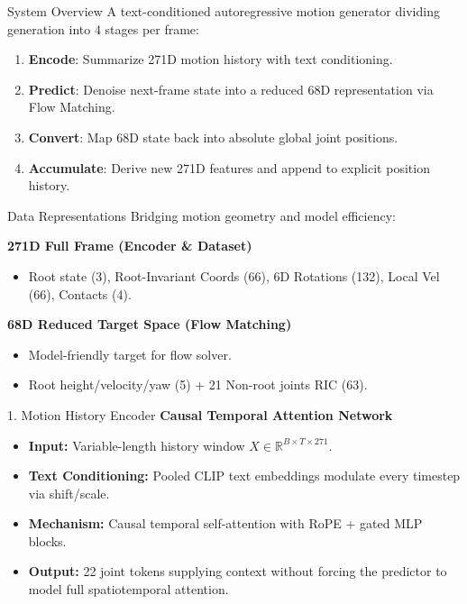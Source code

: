 \documentclass[aspectratio=169]{beamer}
\begin{document}
\begin{frame}{System Overview}
    A text-conditioned autoregressive motion generator dividing generation into 4 stages per frame:
    \begin{enumerate}
        \item \textbf{Encode}: Summarize 271D motion history with text conditioning.
        \item \textbf{Predict}: Denoise next-frame state into a reduced 68D representation via Flow Matching.
        \item \textbf{Convert}: Map 68D state back into absolute global joint positions.
        \item \textbf{Accumulate}: Derive new 271D features and append to explicit position history.
    \end{enumerate}
\end{frame}

\begin{frame}{Data Representations}
    Bridging motion geometry and model efficiency:
    \vspace{0.3cm}
    
    \textbf{271D Full Frame (Encoder \& Dataset)}
    \begin{itemize}
        \item Root state (3), Root-Invariant Coords (66), 6D Rotations (132), Local Vel (66), Contacts (4).
    \end{itemize}
    
    \vspace{0.3cm}
    
    \textbf{68D Reduced Target Space (Flow Matching)}
    \begin{itemize}
        \item Model-friendly target for flow solver.
        \item Root height/velocity/yaw (5) + 21 Non-root joints RIC (63).
    \end{itemize}
\end{frame}

\begin{frame}{1. Motion History Encoder}
    \textbf{Causal Temporal Attention Network}
    \begin{itemize}
        \item \textbf{Input:} Variable-length history window $X \in \mathbb{R}^{B \times T \times 271}$.
        \item \textbf{Text Conditioning:} Pooled CLIP text embeddings modulate every timestep via shift/scale.
        \item \textbf{Mechanism:} Causal temporal self-attention with RoPE + gated MLP blocks.
        \item \textbf{Output:} 22 joint tokens supplying context without forcing the predictor to model full spatiotemporal attention.
    \end{itemize}
\end{frame}
\end{document}
